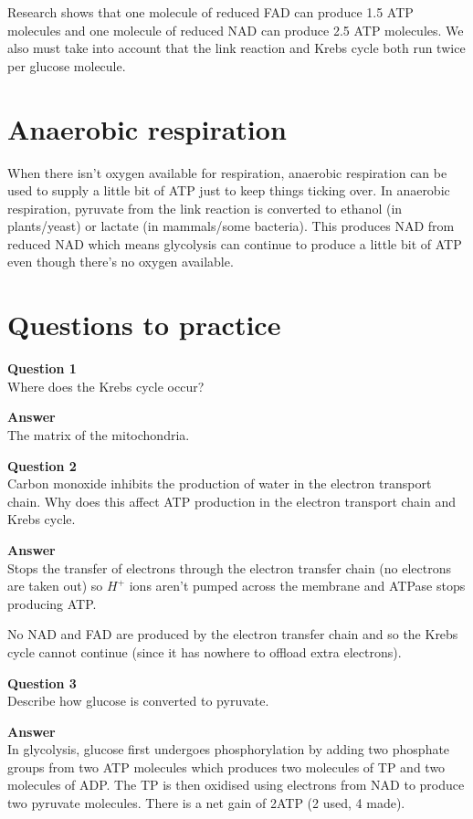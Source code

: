 \documentclass{article}
\begin{document}
Research shows that one molecule of reduced FAD can produce 1.5 ATP molecules
and one molecule of reduced NAD can produce 2.5 ATP molecules. We also must take
into account that the link reaction and Krebs cycle both run twice per glucose
molecule.

\section*{Anaerobic respiration}
When there isn't oxygen available for respiration, anaerobic respiration can be
used to supply a little bit of ATP just to keep things ticking over. In
anaerobic respiration, pyruvate from the link reaction is converted to ethanol
(in plants/yeast) or lactate (in mammals/some bacteria). This produces NAD from
reduced NAD which means glycolysis can continue to produce a little bit of ATP
even though there's no oxygen available.

\section*{Questions to practice}
\textbf{Question 1}\\
Where does the Krebs cycle occur?

\textbf{Answer}\\
The matrix of the mitochondria.

\textbf{Question 2}\\
Carbon monoxide inhibits the production of water in the electron transport
chain. Why does this affect ATP production in the electron transport chain and
Krebs cycle.

\textbf{Answer}\\
Stops the transfer of electrons through the electron transfer chain (no
electrons are taken out) so $H^+$ ions aren't pumped across the membrane and
ATPase stops producing ATP.

No NAD and FAD are produced by the electron transfer chain and so the Krebs
cycle cannot continue (since it has nowhere to offload extra electrons).

\textbf{Question 3}\\
Describe how glucose is converted to pyruvate.

\textbf{Answer}\\
In glycolysis, glucose first undergoes phosphorylation by adding two phosphate
groups from two ATP molecules which produces two molecules of TP and two
molecules of ADP. The TP is then oxidised using electrons from NAD to produce
two pyruvate molecules. There is a net gain of 2ATP (2 used, 4 made).
\end{document}
